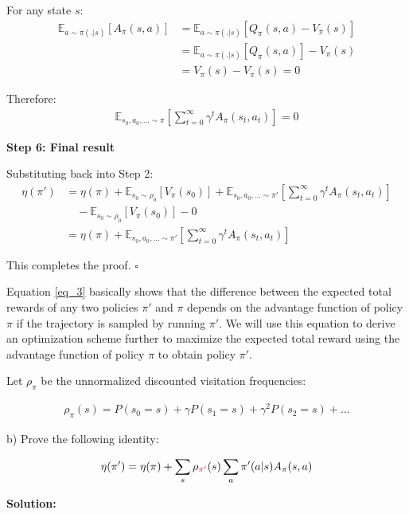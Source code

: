 For any state $s$:
\begin{align}
\mathbb{E}_{a \sim \pi(.|s)}[A_\pi(s,a)] &= \mathbb{E}_{a \sim \pi(.|s)}[Q_\pi(s,a) - V_\pi(s)] \\
&= \mathbb{E}_{a \sim \pi(.|s)}[Q_\pi(s,a)] - V_\pi(s) \\
&= V_\pi(s) - V_\pi(s) = 0
\end{align}

Therefore:
\begin{align}
\mathbb{E}_{s_0, a_0, \ldots \sim \pi} \left[ \sum_{t = 0}^{\infty} \gamma^t A_\pi(s_t, a_t) \right] = 0
\end{align}

\textbf{Step 6: Final result}

Substituting back into Step 2:
\begin{align}
\eta(\pi') &= \eta(\pi) + \mathbb{E}_{s_0 \sim \rho_0} [V_\pi(s_0)] + \mathbb{E}_{s_0, a_0, \ldots \sim \pi'} \left[ \sum_{t = 0}^{\infty} \gamma^t A_\pi(s_t, a_t) \right] \\
&\quad - \mathbb{E}_{s_0 \sim \rho_0} [V_\pi(s_0)] - 0 \\
&= \eta(\pi) + \mathbb{E}_{s_0, a_0, \ldots \sim \pi'} \left[ \sum_{t = 0}^{\infty} \gamma^t A_\pi(s_t, a_t) \right]
\end{align}

This completes the proof. $\square$

Equation \ref{eq_3} basically shows that the difference between the expected total rewards of any two policies $\pi'$ and $\pi$ depends on the advantage function of policy $\pi$ if the trajectory is sampled by running $\pi'$. We will use this equation to derive an optimization scheme further to maximize the expected total reward using the advantage function of policy $\pi$ to obtain policy $\pi'$.

Let $\rho_\pi$ be the unnormalized discounted visitation frequencies:

\begin{align*}
    \rho_\pi(s) = P(s_0 = s)+\gamma P(s_1 = s) + \gamma^2 P(s_2 = s) + \ldots
\end{align*}

b) Prove the following identity:

\begin{align}\label{true_objective}
    \eta(\pi') = \eta(\pi) + \sum_{s}\rho_{\textcolor{red}{\pi'}}(s)\sum_{a}\pi'(a|s)A_{\pi}(s, a)
\end{align}

\textbf{Solution:}

